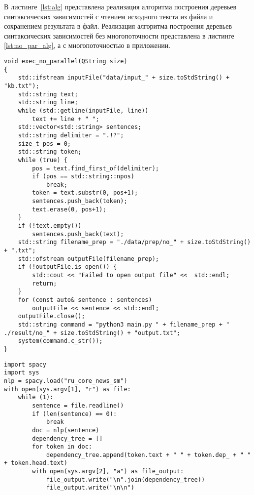 В листинге~\ref{lst:alg} представлена реализация алгоритма построения деревьев синтаксических зависимостей с чтением исходного текста из файла и сохранением результата в файл. Реализация алгоритма построения деревьев синтаксических зависимостей без многопоточности представлена в листинге \ref{lst:no_par_alg}, а с многопоточностью в приложении.
\clearpage
\begin{center}
	\captionsetup{justification=raggedright,singlelinecheck=off}
	\begin{lstlisting}[label=lst:no_par_alg,caption=Алгоритм построения деревьев синтаксических зависимостей без многопоточности]
void exec_no_parallel(QString size)
{
	std::ifstream inputFile("data/input_" + size.toStdString() + "kb.txt");
	std::string text;
	std::string line;
	while (std::getline(inputFile, line))
		text += line + " ";
	std::vector<std::string> sentences;
	std::string delimiter = ".!?";
	size_t pos = 0;
	std::string token;
	while (true) {
		pos = text.find_first_of(delimiter);
		if (pos == std::string::npos) 
			break;
		token = text.substr(0, pos+1);
		sentences.push_back(token);
		text.erase(0, pos+1);
	}
	if (!text.empty()) 
		sentences.push_back(text);
	std::string filename_prep = "./data/prep/no_" + size.toStdString() + ".txt";
	std::ofstream outputFile(filename_prep);
	if (!outputFile.is_open()) {
		std::cout << "Failed to open output file" <<  std::endl;
		return;
	}	
	for (const auto& sentence : sentences)
		outputFile << sentence << std::endl;
	outputFile.close();
	std::string command = "python3 main.py " + filename_prep + " ./result/no_" + size.toStdString() + "output.txt";
	system(command.c_str());
}
	\end{lstlisting}
\end{center}
\clearpage
\begin{center}
	\captionsetup{justification=raggedright,singlelinecheck=off}
	\begin{lstlisting}[label=lst:alg,caption=Алгоритм построения деревьев синтаксических зависимостей с помощью библиотеки spacy]
import spacy
import sys
nlp = spacy.load("ru_core_news_sm")
with open(sys.argv[1], "r") as file:
	while (1):
		sentence = file.readline()
		if (len(sentence) == 0):
			break
		doc = nlp(sentence)
		dependency_tree = []
		for token in doc:
			dependency_tree.append(token.text + " " + token.dep_ + " " + token.head.text)
		with open(sys.argv[2], "a") as file_output:
			file_output.write("\n".join(dependency_tree))
			file_output.write("\n\n")
	\end{lstlisting}
\end{center}

